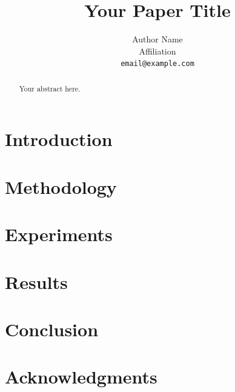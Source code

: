 \documentclass[11pt]{article}
\title{Your Paper Title}
\author{
    Author Name \\
    Affiliation \\
    \texttt{email@example.com}
}
\newtheorem theorem}{Theorem}
\begin{document}
\maketitle

\begin{abstract}
Your abstract here.
\end{abstract}

\section{Introduction}

\section{Methodology}

\section{Experiments}

\section{Results}

\section{Conclusion}

\section*{Acknowledgments}



\end{document}
